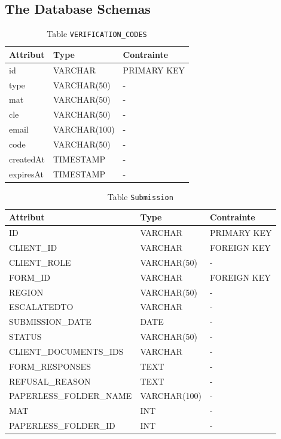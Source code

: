 \subsection{The Database Schemas}
\begin{table}[h!]
\centering
\begin{tabular}{|l|l|l|}
\hline
\textbf{Attribut} & \textbf{Type} & \textbf{Contrainte} \\
\hline
id & VARCHAR & PRIMARY KEY \\
type & VARCHAR(50) & - \\
mat & VARCHAR(50) & - \\
cle & VARCHAR(50) & - \\
email & VARCHAR(100) & - \\
code & VARCHAR(50) & - \\
createdAt & TIMESTAMP & - \\
expiresAt & TIMESTAMP & - \\
\hline
\end{tabular}
\caption{Table \texttt{VERIFICATION\_CODES}}
\end{table}
\clearpage
\begin{table}[h!]
\centering
\begin{tabular}{|l|l|l|}
\hline
\textbf{Attribut} & \textbf{Type} & \textbf{Contrainte} \\
\hline
ID & VARCHAR & PRIMARY KEY \\
CLIENT\_ID & VARCHAR & FOREIGN KEY \\
CLIENT\_ROLE & VARCHAR(50) & - \\
FORM\_ID & VARCHAR & FOREIGN KEY \\
REGION & VARCHAR(50) & - \\
ESCALATEDTO & VARCHAR & - \\
SUBMISSION\_DATE & DATE & - \\
STATUS & VARCHAR(50) & - \\
CLIENT\_DOCUMENTS\_IDS & VARCHAR & - \\
FORM\_RESPONSES & TEXT & - \\
REFUSAL\_REASON & TEXT & - \\
PAPERLESS\_FOLDER\_NAME & VARCHAR(100) & - \\
MAT & INT & - \\
PAPERLESS\_FOLDER\_ID & INT & - \\
\hline
\end{tabular}
\caption{Table \texttt{Submission}}
\end{table}

